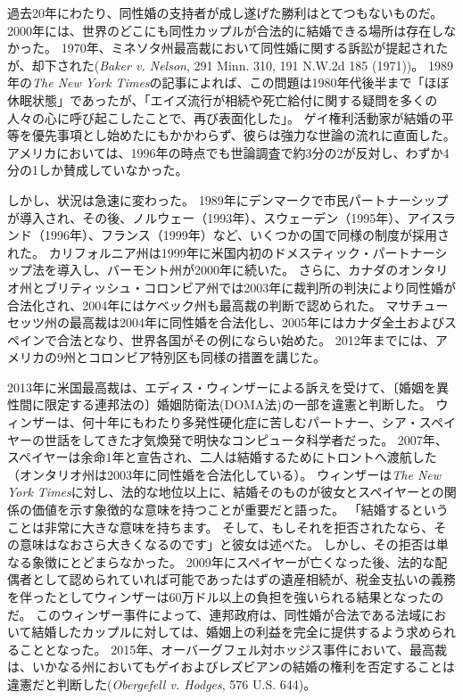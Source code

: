 \documentclass[paper=a4,book,openany]{jlreq} \usepackage{mystyle}
\begin{document}
過去20年にわたり、同性婚の支持者が成し遂げた勝利はとてつもないものだ。
2000年には、世界のどこにも同性カップルが合法的に結婚できる場所は存在しなかった。
1970年、ミネソタ州最高裁において同性婚に関する訴訟が提起されたが、却下された(\emph{Baker v. Nelson}, 291 Minn. 310, 191 N.W.2d 185 (1971))。
1989年の\emph{The New York Times}の記事によれば、この問題は1980年代後半まで「ほぼ休眠状態」であったが、「エイズ流行が相続や死亡給付に関する疑問を多くの人々の心に呼び起こしたことで、再び表面化した」\citep{gutis89:_small_steps_accep_renew_debat_gay_marriag}。
ゲイ権利活動家が結婚の平等を優先事項とし始めたにもかかわらず、彼らは強力な世論の流れに直面した。
アメリカにおいては、1996年の時点でも世論調査で約3分の2が反対し、わずか4分の1しか賛成していなかった\citep{center12:_growin_public_suppor_same_sex_marriag}。

しかし、状況は急速に変わった。
1989年にデンマークで市民パートナーシップが導入され、その後、ノルウェー（1993年）、スウェーデン（1995年）、アイスランド（1996年）、フランス（1999年）など、いくつかの国で同様の制度が採用された。
カリフォルニア州は1999年に米国内初のドメスティック・パートナーシップ法を導入し、バーモント州が2000年に続いた。
さらに、カナダのオンタリオ州とブリティッシュ・コロンビア州では2003年に裁判所の判決により同性婚が合法化され、2004年にはケベック州も最高裁の判断で認められた。
マサチューセッツ州の最高裁は2004年に同性婚を合法化し、2005年にはカナダ全土およびスペインで合法となり、世界各国がその例にならい始めた。
2012年までには、アメリカの9州とコロンビア特別区も同様の措置を講じた。

2013年に米国最高裁は、エディス・ウィンザーによる訴えを受けて、〔婚姻を異性間に限定する連邦法の〕婚姻防衛法(DOMA法)の一部を違憲と判断した。
ウィンザーは、何十年にもわたり多発性硬化症に苦しむパートナー、シア・スペイヤーの世話をしてきた才気煥発で明快なコンピュータ科学者だった。
2007年、スペイヤーは余命1年と宣告され、二人は結婚するためにトロントへ渡航した（オンタリオ州は2003年に同性婚を合法化している）。
ウィンザーは\emph{The New York Times}に対し、法的な地位以上に、結婚そのものが彼女とスペイヤーとの関係の価値を示す象徴的な意味を持つことが重要だと語った。
「結婚するということは非常に大きな意味を持ちます。
そして、もしそれを拒否されたなら、その意味はなおさら大きくなるのです」と彼女は述べた。
しかし、その拒否は単なる象徴にとどまらなかった。
2009年にスペイヤーが亡くなった後、法的な配偶者として認められていれば可能であったはずの遺産相続が、税金支払いの義務を伴ったとしてウィンザーは60万ドル以上の負担を強いられる結果となったのだ\citep{applebome12:_revel_her_suprem_court_momen}。
このウィンザー事件によって、連邦政府は、同性婚が合法である法域において結婚したカップルに対しては、婚姻上の利益を完全に提供するよう求められることとなった。
2015年、オーバーグフェル対ホッジス事件において、最高裁は、いかなる州においてもゲイおよびレズビアンの結婚の権利を否定することは違憲だと判断した(\emph{Obergefell v. Hodges}, 576 U.S. 644)。
\end{document}
